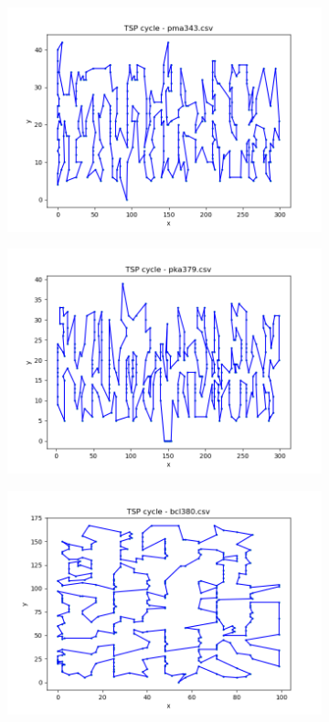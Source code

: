 \documentclass[12pt]{article}
\begin{document}
\begin{figure}[htpb]
\begin{subfigure}[b]{0.475\textwidth}
                \includegraphics[width=\linewidth]{img/pma343.png}
            \end{subfigure}
            \hfill
            \begin{subfigure}[b]{0.475\textwidth}
                \includegraphics[width=\linewidth]{img/pka379.png}
            \end{subfigure}
            \begin{subfigure}[b]{0.475\textwidth}
                \includegraphics[width=\linewidth]{img/bcl380.png}

\end{subfigure}
\end{figure}
\end{document}
